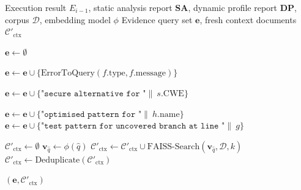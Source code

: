 \begin{algorithm}[htbp]
\caption{Evidence Aggregation and Execution-Driven Retrieval}
\label{alg:evidence}
\begin{algorithmic}[1]

\REQUIRE Execution result $E_{i-1}$, static analysis report $\mathbf{SA}$, dynamic profile report $\mathbf{DP}$, corpus $\mathcal{D}$, embedding model $\phi$
\ENSURE Evidence query set $\mathbf{e}$, fresh context documents $\mathcal{C}'_{\text{ctx}}$

\STATE $\mathbf{e} \leftarrow \emptyset$

\STATE {}
    \STATE $\mathbf{e} \leftarrow \mathbf{e} \cup \{\text{ErrorToQuery}(f.\text{type}, f.\text{message})\}$
\ENDFOR

\STATE {}
    \STATE $\mathbf{e} \leftarrow \mathbf{e} \cup \{\texttt{"secure alternative for "} \| \ s.\text{CWE}\}$
\ENDFOR

\STATE {}
    \STATE $\mathbf{e} \leftarrow \mathbf{e} \cup \{\texttt{"optimised pattern for "} \| \ h.\text{name}\}$
\ENDFOR
{}
    \STATE $\mathbf{e} \leftarrow \mathbf{e} \cup \{\texttt{"test pattern for uncovered branch at line "} \| \ g\}$
\ENDFOR

\STATE {}
\STATE $\mathcal{C}'_{\text{ctx}} \leftarrow \emptyset$
    \STATE $\mathbf{v}_{\hat{q}} \leftarrow \phi(\hat{q})$
    \STATE $\mathcal{C}'_{\text{ctx}} \leftarrow \mathcal{C}'_{\text{ctx}} \cup \text{FAISS-Search}(\mathbf{v}_{\hat{q}}, \mathcal{D}, k)$
\ENDFOR
\STATE $\mathcal{C}'_{\text{ctx}} \leftarrow \text{Deduplicate}(\mathcal{C}'_{\text{ctx}})$

\RETURN $(\mathbf{e}, \mathcal{C}'_{\text{ctx}})$

\end{algorithmic}
\end{algorithm}




